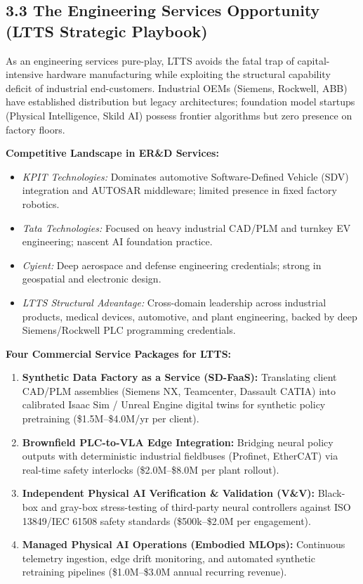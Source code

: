 \documentclass[11pt,a4paper]{article}
\begin{document}
\subsection{3.3 The Engineering Services Opportunity (LTTS Strategic Playbook)}
As an engineering services pure-play, LTTS avoids the fatal trap of capital-intensive hardware manufacturing while exploiting the structural capability deficit of industrial end-customers. Industrial OEMs (Siemens, Rockwell, ABB) have established distribution but legacy architectures; foundation model startups (Physical Intelligence, Skild AI) possess frontier algorithms but zero presence on factory floors.

\textbf{Competitive Landscape in ER\&D Services:}
\begin{itemize}
    \item \textit{KPIT Technologies:} Dominates automotive Software-Defined Vehicle (SDV) integration and AUTOSAR middleware; limited presence in fixed factory robotics.
    \item \textit{Tata Technologies:} Focused on heavy industrial CAD/PLM and turnkey EV engineering; nascent AI foundation practice.
    \item \textit{Cyient:} Deep aerospace and defense engineering credentials; strong in geospatial and electronic design.
    \item \textit{LTTS Structural Advantage:} Cross-domain leadership across industrial products, medical devices, automotive, and plant engineering, backed by deep Siemens/Rockwell PLC programming credentials.
\end{itemize}

\textbf{Four Commercial Service Packages for LTTS:}
\begin{enumerate}
    \item \textbf{Synthetic Data Factory as a Service (SD-FaaS):} Translating client CAD/PLM assemblies (Siemens NX, Teamcenter, Dassault CATIA) into calibrated Isaac Sim / Unreal Engine digital twins for synthetic policy pretraining (\$1.5M--\$4.0M/yr per client).
    \item \textbf{Brownfield PLC-to-VLA Edge Integration:} Bridging neural policy outputs with deterministic industrial fieldbuses (Profinet, EtherCAT) via real-time safety interlocks (\$2.0M--\$8.0M per plant rollout).
    \item \textbf{Independent Physical AI Verification \& Validation (V\&V):} Black-box and gray-box stress-testing of third-party neural controllers against ISO 13849/IEC 61508 safety standards (\$500k--\$2.0M per engagement).
    \item \textbf{Managed Physical AI Operations (Embodied MLOps):} Continuous telemetry ingestion, edge drift monitoring, and automated synthetic retraining pipelines (\$1.0M--\$3.0M annual recurring revenue).
\end{enumerate}
\end{document}

